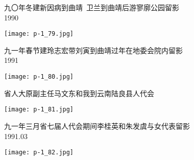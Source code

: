\begin{tcolorbox}[notitle,grow to right by=1in,boxrule=0pt,colback=DarkRed,colframe=DarkRed]
    \fontsize{1cm}{0.9cm}\selectfont
    \raggedleft
    \noindent
    九〇年冬建新因病到曲靖~卫兰到曲靖后游寥廓公园留影\\
    \Large
    1990\\
    
\end{tcolorbox}
\begin{center}
    \texttt{[image: p-1\_79.jpg]}
\end{center}
\clearpage


\begin{tcolorbox}[notitle,grow to right by=1in,boxrule=0pt,colback=DarkRed,colframe=DarkRed]
    \fontsize{1cm}{0.9cm}\selectfont
    \raggedleft
    \noindent
    九一年春节建玲志宏带刘寅到曲靖过年在地委会院内留影\\
    \Large
    1991\\
    
\end{tcolorbox}
\begin{center}
    \texttt{[image: p-1\_80.jpg]}
\end{center}
\clearpage


\begin{tcolorbox}[notitle,grow to right by=1in,boxrule=0pt,colback=DarkRed,colframe=DarkRed]
    \fontsize{1cm}{0.9cm}\selectfont
    \raggedleft
    \noindent
    省人大原副主任马文东和我到云南陆良县人代会\\
    \Large

    
\end{tcolorbox}
\begin{center}
    \texttt{[image: p-1\_81.jpg]}
\end{center}
\clearpage


\begin{tcolorbox}[notitle,grow to right by=1in,boxrule=0pt,colback=DarkRed,colframe=DarkRed]
    \fontsize{1cm}{0.9cm}\selectfont
    \raggedleft
    \noindent
    九一年三月省七届人代会期间李桂英和朱发虞与女代表留影\\
    \Large
    1991.03\\
    
\end{tcolorbox}
\begin{center}
    \texttt{[image: p-1\_82.jpg]}
\end{center}
\clearpage


